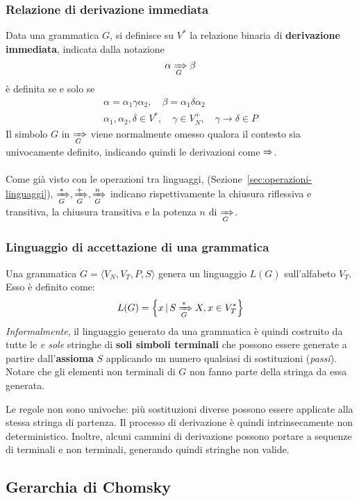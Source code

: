 \documentclass[italian, 10pt]{article}
\begin{document}
\subsubsection{Relazione di derivazione immediata}

Data una grammatica \(G\), si definisce su \(V^\ast\) la relazione binaria di \textbf{derivazione immediata}, indicata dalla notazione
\[ \alpha \xRightarrow[G]{} \beta \]
è definita se e solo se
\begin{gather*}
  \alpha = \alpha_1 \gamma \alpha_2, \quad \beta = \alpha_1 \delta \alpha_2 \\
  \alpha_1, \alpha_2, \delta \in V^\ast,\quad \gamma \in V_N^+, \quad \gamma \rightarrow \delta \in P
\end{gather*}
Il simbolo \(G\) in \(\xRightarrow[G]{}\) viene normalmente omesso qualora il contesto sia univocamente definito, indicando quindi le derivazioni come \(\xRightarrow{}\).

Come già visto con le operazioni tra linguaggi, (Sezione~\ref{sec:operazioni-linguaggi}), \(\xRightarrow[G]{\ast}, \xRightarrow[G]{+}, \xRightarrow[G]{n}\) indicano rispettivamente la chiusura riflessiva e transitiva, la chiusura transitiva e la potenza \(n\) di \(\xRightarrow[G]{}\).

\subsubsection{Linguaggio di accettazione di una grammatica}

Una grammatica \(G = \langle V_N, V_T, P, S \rangle\) genera un linguaggio \(L(G)\) sull'alfabeto \(V_T\).
Esso è definito come:
\[ L(G) = \left\{x \, | \, S \xRightarrow[G]{\ast} X, x \in V_T^\ast\right\} \]
\textit{Informalmente}, il linguaggio generato da una grammatica è quindi costruito da tutte le \textit{e sole} stringhe di \textbf{soli simboli terminali} che possono essere generate a partire dall'\textbf{assioma} \(S\) applicando un numero qualsiasi di sostituzioni (\textit{passi}).
Notare che gli elementi non terminali di \(G\) non fanno parte della stringa da essa generata.

Le regole non sono univoche: più sostituzioni diverse possono essere applicate alla stessa stringa di partenza.
Il processo di derivazione è quindi intrinsecamente non deterministico.
Inoltre, alcuni cammini di derivazione possono portare a sequenze di terminali e non terminali, generando quindi stringhe non valide.

\subsection{Gerarchia di Chomsky}
\label{sec:gerarchia-di-Chomsky}
\end{document}
